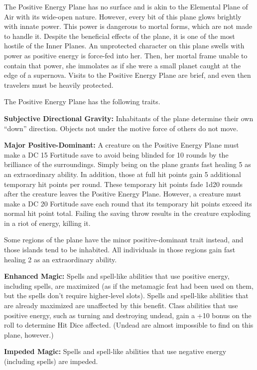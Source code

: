 The Positive Energy Plane has no surface and is akin to the Elemental Plane of Air with its wide-open nature. However, every bit of this plane glows brightly with innate power. This power is dangerous to mortal forms, which are not made to handle it. Despite the beneficial effects of the plane, it is one of the most hostile of the Inner Planes. An unprotected character on this plane swells with power as positive energy is force-fed into her. Then, her mortal frame unable to contain that power, she immolates as if she were a small planet caught at the edge of a supernova. Visits to the Positive Energy Plane are brief, and even then travelers must be heavily protected.

The Positive Energy Plane has the following traits.
\begin{itemize*}
\item \textbf{Subjective Directional Gravity:} Inhabitants of the plane determine their own ``down'' direction. Objects not under the motive force of others do not move.
\item \textbf{Major Positive-Dominant:} A creature on the Positive Energy Plane must make a DC 15 Fortitude save to avoid being blinded for 10 rounds by the brilliance of the surroundings. Simply being on the plane grants fast healing 5 as an extraordinary ability. In addition, those at full hit points gain 5 additional temporary hit points per round. These temporary hit points fade 1d20 rounds after the creature leaves the Positive Energy Plane. However, a creature must make a DC 20 Fortitude save each round that its temporary hit points exceed its normal hit point total. Failing the saving throw results in the creature exploding in a riot of energy, killing it.

Some regions of the plane have the minor positive-dominant trait instead, and those islands tend to be inhabited. All individuals in those regions gain fast healing 2 as an extraordinary ability.
\item \textbf{Enhanced Magic:} Spells and spell-like abilities that use positive energy, including  spells, are maximized (as if the  metamagic feat had been used on them, but the spells don't require higher-level slots). Spells and spell-like abilities that are already maximized are unaffected by this benefit. Class abilities that use positive energy, such as turning and destroying undead, gain a +10 bonus on the roll to determine Hit Dice affected. (Undead are almost impossible to find on this plane, however.)
\item \textbf{Impeded Magic:} Spells and spell-like abilities that use negative energy (including  spells) are impeded.
\end{itemize*}
